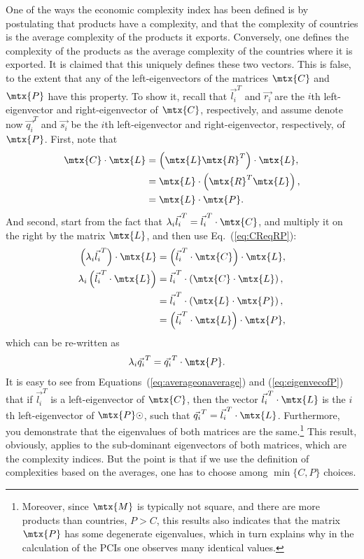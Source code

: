 \documentclass[9pt,twocolumn,twoside,lineno]{pnas-new}
\begin{document}
One of the ways the economic complexity index has been defined is by postulating that products have a complexity, and that the complexity of countries is the average complexity of the products it exports. Conversely, one defines the complexity of the products as the average complexity of the countries where it is exported. It is claimed that this uniquely defines these two vectors. This is false, to the extent that any of the left-eigenvectors of the matrices $\mtx{C}$ and $\mtx{P}$ have this property. To show it, recall that $\vec{l_i}^T$ and $\vec{r_i}$ are the $i$th left-eigenvector and right-eigenvector of $\mtx{C}$, respectively, and assume denote now $\vec{q_i}^T$ and $\vec{s_i}$ be the $i$th left-eigenvector and right-eigenvector, respectively, of $\mtx{P}$. First, note that
\begin{align}
    \mtx{C}\cdot\mtx{L} &= \left(\mtx{L}\mtx{R}^T\right)\cdot\mtx{L}, \nonumber \\
    &= \mtx{L}\cdot\left(\mtx{R}^T\mtx{L}\right), \nonumber \\
    &= \mtx{L}\cdot \mtx{P}.
\label{eq:CReqRP}
\end{align}
And second, start from the fact that $\lambda_i \vec{l_i}^T = \vec{l_i}^T\cdot \mtx{C}$, and multiply it on the right by the matrix $\mtx{L}$, and then use Eq.~(\ref{eq:CReqRP}):
\begin{align}
    \left(\lambda_i \vec{l_i}^T\right)\cdot\mtx{L}&=\left(\vec{l_i}^T\cdot \mtx{C}\right)\cdot\mtx{L}, \nonumber \\
    \lambda_i \left(\vec{l_i}^T\cdot\mtx{L}\right)&= \vec{l_i}^T\cdot \left(\mtx{C}\cdot\mtx{L}\right), \nonumber \\
    &= \vec{l_i}^T\cdot \left(\mtx{L}\cdot \mtx{P}\right), \nonumber \\
    &= \left(\vec{l_i}^T\cdot \mtx{L}\right)\cdot \mtx{P}, \label{eq:averageonaverage}
\end{align}
which can be re-written as
\begin{align}
    \lambda_i \vec{q_i}^T &= \vec{q_i}^T\cdot \mtx{P}. \label{eq:eigenvecofP}
\end{align}
It is easy to see from Equations~(\ref{eq:averageonaverage}) and (\ref{eq:eigenvecofP}) that if $\vec{l_i}^T$ is a left-eigenvector of $\mtx{C}$, then the vector $\vec{l_i}^T\cdot \mtx{L}$ is the $i$th left-eigenvector of $\mtx{P}\odot$, such that $\vec{q_i}^T = \vec{l_i}^T\cdot \mtx{L}$. Furthermore, you demonstrate that the eigenvalues of both matrices are the same.\footnote{Moreover, since $\mtx{M}$ is typically not square, and there are more products than countries, $P>C$, this results also indicates that the matrix $\mtx{P}$ has some degenerate eigenvalues, which in turn explains why in the calculation of the PCIs one observes many identical values.} This result, obviously, applies to the sub-dominant eigenvectors of both matrices, which are the complexity indices. But the point is that if we use the definition of complexities based on the averages, one has to choose among $\min\{C,P\}$ choices.
\end{document}
